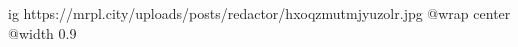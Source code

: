  
 
 
 
 

\ifcmt
  ig https://mrpl.city/uploads/posts/redactor/hxoqzmutmjyuzolr.jpg
  @wrap center
  @width 0.9
\fi
